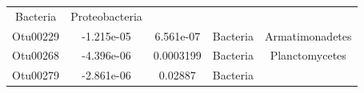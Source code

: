 \documentclass[]{article}
\begin{document}
\begin{longtable}[]{@{}ccccc@{}}
\begin{minipage}[t]{0.13\columnwidth}
Bacteria\strut
\end{minipage} & \begin{minipage}[t]{0.27\columnwidth}\centering\strut
Proteobacteria\strut
\end{minipage}\tabularnewline
\begin{minipage}[t]{0.13\columnwidth}\centering\strut
Otu00229\strut
\end{minipage} & \begin{minipage}[t]{0.16\columnwidth}\centering\strut
-1.215e-05\strut
\end{minipage} & \begin{minipage}[t]{0.14\columnwidth}\centering\strut
6.561e-07\strut
\end{minipage} & \begin{minipage}[t]{0.13\columnwidth}\centering\strut
Bacteria\strut
\end{minipage} & \begin{minipage}[t]{0.27\columnwidth}\centering\strut
Armatimonadetes\strut
\end{minipage}\tabularnewline
\begin{minipage}[t]{0.13\columnwidth}\centering\strut
Otu00268\strut
\end{minipage} & \begin{minipage}[t]{0.16\columnwidth}\centering\strut
-4.396e-06\strut
\end{minipage} & \begin{minipage}[t]{0.14\columnwidth}\centering\strut
0.0003199\strut
\end{minipage} & \begin{minipage}[t]{0.13\columnwidth}\centering\strut
Bacteria\strut
\end{minipage} & \begin{minipage}[t]{0.27\columnwidth}\centering\strut
Planctomycetes\strut
\end{minipage}\tabularnewline
\begin{minipage}[t]{0.13\columnwidth}\centering\strut
Otu00279\strut
\end{minipage} & \begin{minipage}[t]{0.16\columnwidth}\centering\strut
-2.861e-06\strut
\end{minipage} & \begin{minipage}[t]{0.14\columnwidth}\centering\strut
0.02887\strut
\end{minipage} & \begin{minipage}[t]{0.13\columnwidth}\centering\strut
Bacteria\strut
\end{minipage} & \begin{minipage}[t]{0.27\columnwidth}\centering\strut

\end{minipage}
\end{longtable}
\end{document}
